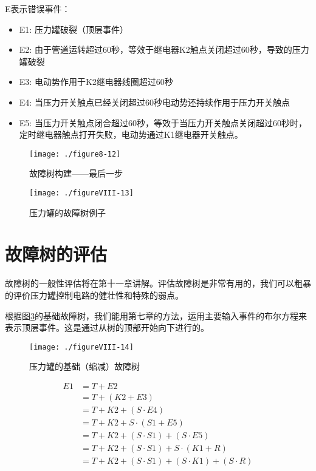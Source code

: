 \documentclass[cn,11pt,chinese]{elegantbook}
\begin{document}
{E表示错误事件：
\begin{itemize}
	\item E1: 压力罐破裂（顶层事件）
\item E2: 由于管道运转超过60秒，等效于继电器K2触点关闭超过60秒，导致的压力罐破裂
\item E3: 电动势作用于K2继电器线圈超过60秒
\item E4: 当压力开关触点已经关闭超过60秒电动势还持续作用于压力开关触点
\item E5: 当压力开关触点闭合超过60秒，等效于当压力开关触点关闭超过60秒时，定时继电器触点打开失败，电动势通过K1继电器开关触点。
\end{itemize}

\begin{figure}[H]
	\centering
	\texttt{[image: ./figure8-12]}
	\caption{故障树构建——最后一步}
	\label{fig8-12}
\end{figure}

\begin{figure}[H]
	\centering
	\texttt{[image: ./figureVIII-13]}
	\caption{压力罐的故障树例子}
	\label{fig8-13}
\end{figure}

\section{故障树的评估}

故障树的一般性评估将在第十一章讲解。评估故障树是非常有用的，我们可以粗暴的评价压力罐控制电路的健壮性和特殊的弱点。

根据图\ref{fig8-14}的基础故障树，我们能用第七章的方法，运用主要输入事件的布尔方程来表示顶层事件。这是通过从树的顶部开始向下进行的。

\begin{figure}[H]
	\centering
	\texttt{[image: ./figureVIII-14]}
	\caption{压力罐的基础（缩减）故障树}
	\label{fig8-14}
\end{figure}

\begin{align*}
E1  &= T+E2 \\
&=T+(K2+E3) \\
&=T+K2+(S\cdot E4)  \\
&=T+K2+S\cdot (S1+E5)   \\
&=T+K2+(S\cdot S1)+(S\cdot E5)  \\
&=T+K2+(S\cdot S1)+S\cdot(K1+R) \\
&=T+K2+(S\cdot S1)+(S\cdot K1)+(S\cdot R)
\end{align*}

}
\end{document}
